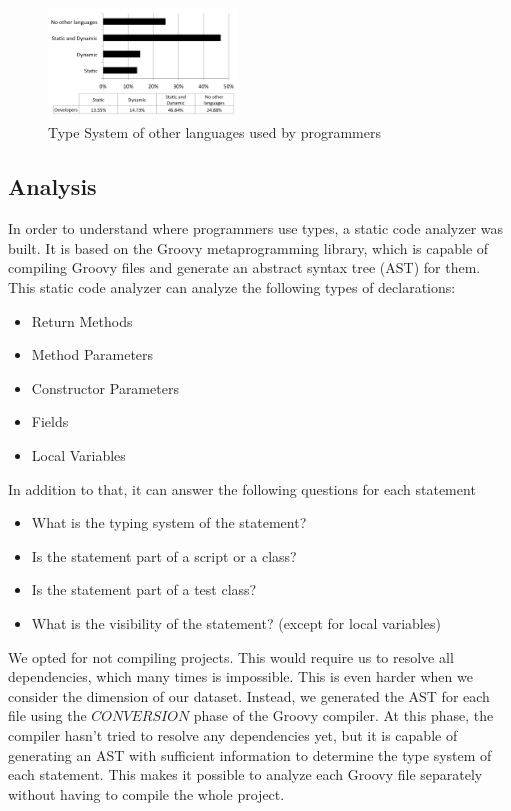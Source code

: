 \documentclass[preprint]{sigplanconf}
\begin{document}
\begin{figure}[ht]
\centering \includegraphics[width=0.45\textwidth]{images/typeSystem_background}
\caption{Type System of other languages used by programmers}
\label{fig:typeSystem_background} 
\end{figure}



\subsection{Analysis\label{analyzer}}
In order to understand where programmers use types, a static code analyzer was built. 
It is based on the Groovy metaprogramming library, which is capable of compiling Groovy files and generate an abstract syntax tree (AST) for them.
This static code analyzer can analyze the following types of declarations:

\begin{itemize}
	\item Return Methods
	\item Method Parameters
	\item Constructor Parameters
	\item Fields
	\item Local Variables
\end{itemize}

In addition to that, it can answer the following questions for each statement
\begin{itemize}
	\item What is the typing system of the statement?
	\item Is the statement part of a script or a class?
	\item Is the statement part of a test class?
	\item What is the visibility of the statement? (except for local variables)
\end{itemize}


We opted for not compiling projects.
This would require us to resolve all dependencies, which many times is impossible.
This is even harder when we consider the dimension of our dataset.
Instead, we generated the AST for each file using the $CONVERSION$ phase of the Groovy compiler.
At this phase, the compiler hasn't tried to resolve any dependencies yet, but it is capable of generating an AST with sufficient information to determine the type system of each statement.
This makes it possible to analyze each Groovy file separately without having to compile the whole project.
\end{document}
